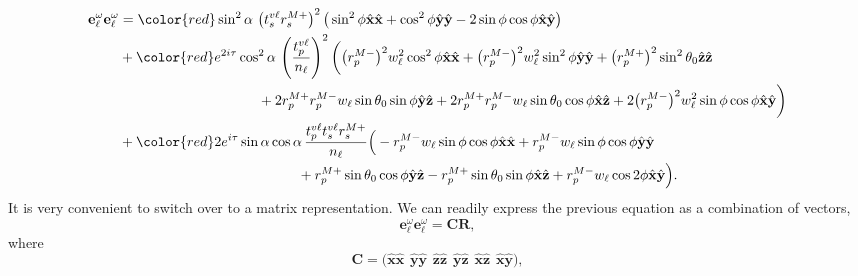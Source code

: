 \documentclass[aps,pra,10pt,amsmath,notitlepage,letterpaper]{revtex4-1}
\begin{document}
\begin{equation}
\begin{split}
\mathbf{e}^{\omega}_{\ell}
\mathbf{e}^{\omega}_{\ell}
&=
{\color{red}\sin^{2}\alpha}\,
\left(t^{v\ell}_{s}r^{M+}_{s}\right)^{2}
\big(
  \sin^{2}\phi\hat{\mathbf{x}}\hat{\mathbf{x}}
 + \cos^{2}\phi\hat{\mathbf{y}}\hat{\mathbf{y}}
 - 2\sin\phi\cos\phi\hat{\mathbf{x}}\hat{\mathbf{y}}
\big)\\
&+
{\color{red}e^{2i\tau} \cos^{2}\alpha}\,
\left(\frac{t^{v\ell}_{p}}{n_{\ell}}\right)^{2}
\bigg(
\big(r^{M-}_{p}\big)^{2}w^{2}_{\ell}\cos^{2}\phi
    \hat{\mathbf{x}}\hat{\mathbf{x}}
  + \big(r^{M-}_{p}\big)^{2}w^{2}_{\ell}\sin^{2}\phi
    \hat{\mathbf{y}}\hat{\mathbf{y}}
  + \big(r^{M+}_{p}\big)^{2}\sin^{2}\theta_{0}
    \hat{\mathbf{z}}\hat{\mathbf{z}}\\
  &\hspace{3.5cm}+ 2r^{M+}_{p}r^{M-}_{p}w_{\ell}\sin\theta_{0}\sin\phi
    \hat{\mathbf{y}}\hat{\mathbf{z}}
  + 2r^{M+}_{p}r^{M-}_{p}w_{\ell}\sin\theta_{0}\cos\phi
    \hat{\mathbf{x}}\hat{\mathbf{z}}
  + 2\big(r^{M-}_{p}\big)^{2}w^{2}_{\ell}\sin\phi\cos\phi
    \hat{\mathbf{x}}\hat{\mathbf{y}}
\bigg)\\
&+
{\color{red}2e^{i\tau}\sin\alpha\cos\alpha}\,
\frac{t^{v\ell}_{p}t^{v\ell}_{s}r^{M+}_{s}}{n_{\ell}}
\Big(
  - r^{M-}_{p}w_{\ell}\sin\phi\cos\phi
    \hat{\mathbf{x}}\hat{\mathbf{x}}
  + r^{M-}_{p}w_{\ell}\sin\phi\cos\phi
    \hat{\mathbf{y}}\hat{\mathbf{y}}\\
  &\hspace{4.5cm}+ r^{M+}_{p}\sin\theta_{0}\cos\phi
    \hat{\mathbf{y}}\hat{\mathbf{z}}
  - r^{M+}_{p}\sin\theta_{0}\sin\phi
    \hat{\mathbf{x}}\hat{\mathbf{z}}
  + r^{M-}_{p}w_{\ell}\cos 2\phi
    \hat{\mathbf{x}}\hat{\mathbf{y}}
\Big).
\end{split}
\end{equation}
It is very convenient to switch over to a matrix representation. We can readily
express the previous equation as a combination of vectors,
\begin{equation}
\mathbf{e}^{\omega}_{\ell}
\mathbf{e}^{\omega}_{\ell}
=
\mathbf{C}\mathbf{R},
\end{equation}
where
\begin{equation}
\mathbf{C} = 
\big(
\hat{\mathbf{x}}\hat{\mathbf{x}}\hspace{5pt}
\hat{\mathbf{y}}\hat{\mathbf{y}}\hspace{5pt}
\hat{\mathbf{z}}\hat{\mathbf{z}}\hspace{5pt}
\hat{\mathbf{y}}\hat{\mathbf{z}}\hspace{5pt}
\hat{\mathbf{x}}\hat{\mathbf{z}}\hspace{5pt}
\hat{\mathbf{x}}\hat{\mathbf{y}}
\big),
\end{equation}
\end{document}

